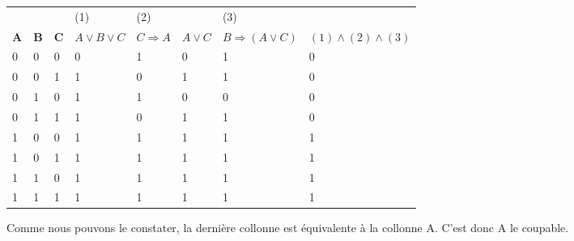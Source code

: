 \documentclass{report}
\begin{document}
    \begin{center}
    \begin{tabular}{llllllll}
    &  &  & (1) & (2) &  & (3) & \\
    $\textbf{A}$ & $\textbf{B}$ & $\textbf{C}$ & $A \vee B \vee C$ & $C \Rightarrow A$ & $A \vee C$ & $B \Rightarrow (A \vee C)$ & $(1)\wedge(2)\wedge(3)$\\
    0 & 0 & 0 & 0 & 1 & 0 & 1 & 0\\
    0 & 0 & 1 & 1 & 0 & 1 & 1 & 0\\
    0 & 1 & 0 & 1 & 1 & 0 & 0 & 0\\
    0 & 1 & 1 & 1 & 0 & 1 & 1 & 0\\
    1 & 0 & 0 & 1 & 1 & 1 & 1 & 1\\
    1 & 0 & 1 & 1 & 1 & 1 & 1 & 1\\
    1 & 1 & 0 & 1 & 1 & 1 & 1 & 1\\
    1 & 1 & 1 & 1 & 1 & 1 & 1 & 1
    \end{tabular}
    \end{center}
  
Comme nous pouvons le constater, la derni\`{e}re collonne est \'{e}quivalente \`{a} la collonne A. C'est donc A le coupable.

  
 
 
 
 
 
 
 
 
 
\end{document}

